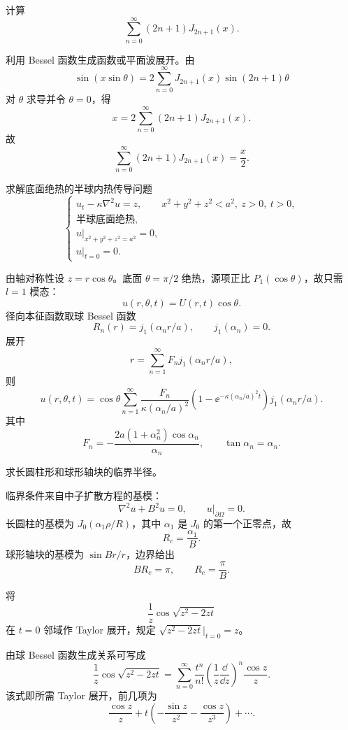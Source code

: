 \begin{question}
计算
\[
\sum_{n=0}^{\infty}(2n+1)J_{2n+1}(x).
\]
\begin{solution}
利用 Bessel 函数生成函数或平面波展开。由
\[
\sin(x\sin\theta)=2\sum_{n=0}^{\infty}J_{2n+1}(x)\sin(2n+1)\theta
\]
对 \(\theta\) 求导并令 \(\theta=0\)，得
\[
x=2\sum_{n=0}^{\infty}(2n+1)J_{2n+1}(x).
\]
故
\[
\sum_{n=0}^{\infty}(2n+1)J_{2n+1}(x)=\frac{x}{2}.
\]
\end{solution}
\end{question}

\begin{question}
求解底面绝热的半球内热传导问题
\[
\begin{cases}
u_t-\kappa\nabla^2u=z,\qquad x^2+y^2+z^2<a^2,\ z>0,\ t>0,\\
\text{半球底面绝热},\\
u|_{x^2+y^2+z^2=a^2}=0,\\
u|_{t=0}=0.
\end{cases}
\]
\begin{solution}
由轴对称性设 \(z=r\cos\theta\)。底面 \(\theta=\pi/2\) 绝热，源项正比 \(P_1(\cos\theta)\)，故只需 \(l=1\) 模态：
\[
u(r,\theta,t)=U(r,t)\cos\theta.
\]
径向本征函数取球 Bessel 函数
\[
R_n(r)=j_1(\alpha_nr/a),\qquad j_1(\alpha_n)=0.
\]
展开
\[
r=\sum_{n=1}^{\infty}F_nj_1(\alpha_nr/a),
\]
则
\[
u(r,\theta,t)=\cos\theta
\sum_{n=1}^{\infty}
\frac{F_n}{\kappa(\alpha_n/a)^2}
\left(1-\ee^{-\kappa(\alpha_n/a)^2t}\right)
j_1(\alpha_nr/a).
\]
其中
\[
F_n=-\frac{2a(1+\alpha_n^2)\cos\alpha_n}{\alpha_n},
\qquad \tan\alpha_n=\alpha_n.
\]
\end{solution}
\end{question}

\begin{question}
求长圆柱形和球形轴块的临界半径。
\begin{solution}
临界条件来自中子扩散方程的基模：
\[
\nabla^2u+B^2u=0,\qquad u|_{\partial\Omega}=0.
\]
长圆柱的基模为 \(J_0(\alpha_1\rho/R)\)，其中 \(\alpha_1\) 是 \(J_0\) 的第一个正零点，故
\[
R_c=\frac{\alpha_1}{B}.
\]
球形轴块的基模为 \(\sin Br/r\)，边界给出
\[
BR_c=\pi,\qquad R_c=\frac{\pi}{B}.
\]
\end{solution}
\end{question}

\begin{question}
将
\[
\frac1z\cos\sqrt{z^2-2zt}
\]
在 \(t=0\) 邻域作 Taylor 展开，规定 \(\sqrt{z^2-2zt}|_{t=0}=z\)。
\begin{solution}
由球 Bessel 函数生成关系可写成
\[
\frac1z\cos\sqrt{z^2-2zt}
=\sum_{n=0}^{\infty}\frac{t^n}{n!}
\left(\frac1z\frac{\dd}{\dd{z}}\right)^n\frac{\cos z}{z}.
\]
该式即所需 Taylor 展开，前几项为
\[
\frac{\cos z}{z}
+t\left(-\frac{\sin z}{z^2}-\frac{\cos z}{z^3}\right)+\cdots .
\]
\end{solution}
\end{question}

